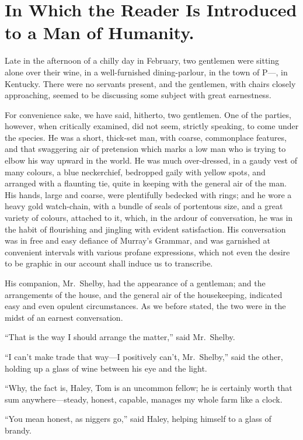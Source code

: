 \chapter{In Which the Reader Is Introduced\\to a Man of Humanity.}

Late in the afternoon of a chilly day in February, two gentlemen were sitting
alone over their wine, in a well-furnished dining-parlour, in the town of P---,
in Kentucky. There were no servants present, and the gentlemen, with chairs
closely approaching, seemed to be discussing some subject with great
earnestness.

For convenience sake, we have said, hitherto, two gentlemen. One of the parties,
however, when critically examined, did not seem, strictly speaking, to come
under the species. He was a short, thick-set man, with coarse, commonplace
features, and that swaggering air of pretension which marks a low man who is
trying to elbow his way upward in the world. He was much over-dressed, in a
gaudy vest of many colours, a blue neckerchief, bedropped gaily with yellow
spots, and arranged with a flaunting tie, quite in keeping with the general air
of the man. His hands, large and coarse, were plentifully
bedecked with rings; and he wore a heavy gold watch-chain, with a bundle of
seals of portentous size, and a great variety of colours, attached to it, which,
in the ardour of conversation, he was in the habit of flourishing and jingling
with evident satisfaction. His conversation was in free and easy defiance of
Murray's Grammar, and was garnished at convenient intervals with various profane
expressions, which not even the desire to be graphic in our account shall induce
us to transcribe.

His companion, Mr.\ Shelby, had the appearance of a gentleman; and the
arrangements of the house, and the general air of the housekeeping, indicated
easy and even opulent circumstances. As we before stated, the two were in the
midst of an earnest conversation.

``That is the way I should arrange the matter,'' said Mr.\ Shelby.

``I can't make trade that way---I positively can't, Mr.\ Shelby,'' said the
other, holding up a glass of wine between his eye and the light.

``Why, the fact is, Haley, Tom is an uncommon fellow; he is certainly worth that
sum anywhere---steady, honest, capable, manages my whole farm like a clock.

``You mean honest, as niggers go,'' said Haley, helping himself to a glass of
brandy.


